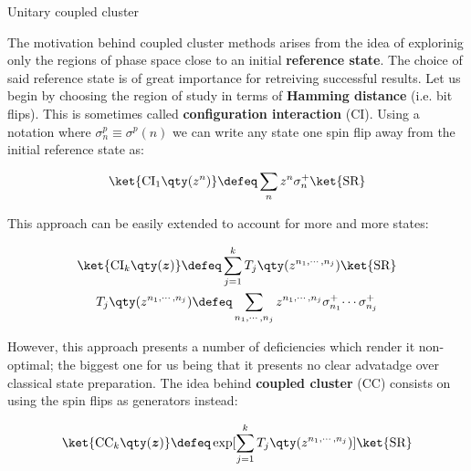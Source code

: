 
\begin{frame}[allowframebreaks]{Unitary coupled cluster}

	The motivation behind coupled cluster methods arises from the idea of explorinig only the regions of phase space close to an initial \textbf{reference state}. The choice of said reference state is of great importance for retreiving successful results. Let us begin by choosing the region of study in terms of \textbf{Hamming distance} (i.e. bit flips). This is sometimes called \textbf{configuration interaction} (CI). Using a notation where $\sigma^{p}_{n} \equiv \sigma^{p}(n)$ we can write any state one spin flip away from the initial reference state as:

	\begin{gather*}
	  \ket{\text{CI}_{1} \qty(z^{n})} \defeq
	    \sum_{n} z^{n} \sigma^{+}_{n} \ket{\text{SR}}
	\end{gather*}

	\vspace{-1em}

	This approach can be easily extended to account for more and more states:

	\begin{gather*}
	  \ket{\text{CI}_{k} \qty(\boldsymbol{z})} \defeq
	    \sum_{j=1}^{k} T_{j} \qty(z^{n_1,\cdots,n_j}) \ket{\text{SR}} \\
	  T_{j} \qty(z^{n_1,\cdots,n_j}) \defeq \sum_{n_1,\cdots,n_j}
	    z^{n_1,\cdots,n_j} \sigma^{+}_{n_1} \! \cdots \sigma^{+}_{n_j}
	\end{gather*}

\break

	However, this approach presents a number of deficiencies which render it non-optimal; the biggest one for us being that it presents no clear advatadge over classical state preparation. The idea behind \textbf{coupled cluster} (CC) consists on using the spin flips as generators instead:

	\begin{gather*}
	  \ket{\text{CC}_{k} \qty(\boldsymbol{z})} \defeq
	    \exp[\sum_{j=1}^{k} T_{j} \qty(z^{n_1,\cdots,n_j})]
	    \ket{\text{SR}}
	\end{gather*}


\end{frame}
